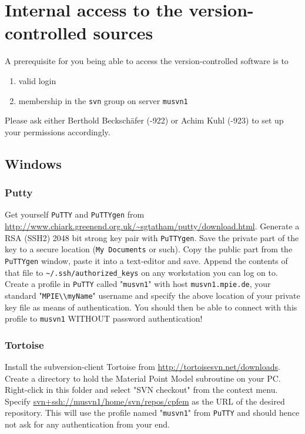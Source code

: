 \section{Internal access to the version-controlled sources}
A prerequisite for you being able to access the version-controlled software is to
\begin{enumerate}
\item valid login
\item membership in the \verb|svn| group on server \verb|musvn1|
\end{enumerate}
Please ask either Berthold Becksch\"afer (-922) or Achim Kuhl (-923) to set up your permissions accordingly. 

\subsection{Windows}
\subsubsection{Putty}
Get yourself \verb|PuTTY| and \verb|PuTTYgen| from \url{http://www.chiark.greenend.org.uk/~sgtatham/putty/download.html}.
Generate a RSA (SSH2) 2048 bit strong key pair with \verb|PuTTYgen|.
Save the private part of the key to a secure location (\verb|My Documents| or such).
Copy the public part from the \verb|PuTTYgen| window, paste it into a text-editor and save.
Append the contents of that file to \verb|~/.ssh/authorized_keys| on any workstation you can log on to. 
Create a profile in \verb|PuTTY| called "\verb|musvn1|" with host \verb|musvn1.mpie.de|, your standard "\verb|MPIE\\myName|" username and specify the above location of your private key file as means of authentication. 
You should then be able to connect with this profile to \verb|musvn1| WITHOUT password authentication! 

\subsubsection{Tortoise}
Install the subversion-client Tortoise from \url{http://tortoisesvn.net/downloads}.
Create a directory to hold the Material Point Model subroutine on your PC. 
Right-click in this folder and select "SVN checkout" from the context menu.
Specify \url{svn+ssh://musvn1/home/svn/repos/cpfem} as the URL of the desired repository.
This will use the profile named "\verb|musvn1|" from \verb|PuTTY| and should hence not ask for any authentication from your end.

